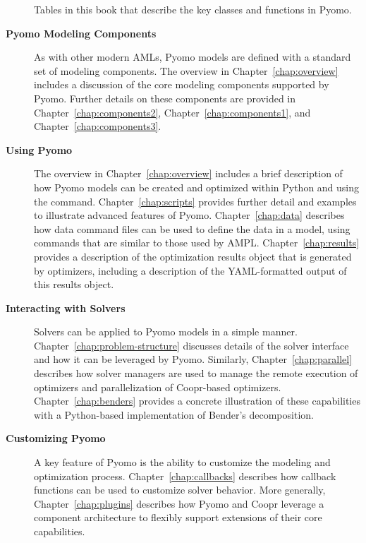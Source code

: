 \begin{description}
\begin{table}[tb]
\caption{\label{table:intro:tables} Tables in this book that describe the key classes and functions in Pyomo.}
\end{table}


\item[{\bf Pyomo Modeling Components}] As with other modern AMLs,
Pyomo models are defined with a standard set of modeling components.
The overview in Chapter~\ref{chap:overview} includes a discussion of
the core modeling components supported by Pyomo.  Further details on
these components are provided in Chapter~\ref{chap:components2}, Chapter~\ref{chap:components1}, and Chapter~\ref{chap:components3}.


\item[{\bf Using Pyomo}] The overview in Chapter~\ref{chap:overview}
includes a brief description of how Pyomo models can be created and
optimized within Python and using the  command.
Chapter~\ref{chap:scripts} provides further detail and examples
to illustrate advanced features of Pyomo.  Chapter~\ref{chap:data}
describes how data command files can be used to define the data
in a model, using commands that are similar to those used by AMPL.
Chapter~\ref{chap:results} provides a description of the optimization
results object that is generated by optimizers, including a description
of the YAML-formatted output of this results object.
\fi

\item[{\bf Interacting with Solvers}] Solvers can be applied to Pyomo
models in a simple manner.  Chapter~\ref{chap:problem-structure} discusses
details of the solver interface and how it can be leveraged by Pyomo.
Similarly, Chapter~\ref{chap:parallel} describes how solver managers are
used to manage the remote execution of optimizers and parallelization of
Coopr-based optimizers.  Chapter~\ref{chap:benders} provides a concrete
illustration of these capabilities with a Python-based implementation
of Bender's decomposition.
\fi

\item[{\bf Customizing Pyomo}] A key feature of Pyomo is the
ability to customize the modeling and optimization process.
Chapter~\ref{chap:callbacks} describes how callback functions can be used
to customize solver behavior.  More generally, Chapter~\ref{chap:plugins}
describes how Pyomo and Coopr leverage a component architecture to
flexibly support extensions of their core capabilities.
\fi


\end{description}
